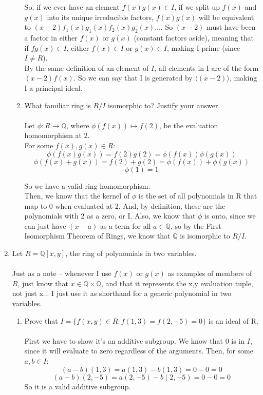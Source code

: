 \begin{enumerate}
\begin{enumerate}
          So, if we ever have an element $f(x)g(x) \in I$, if we split up $f(x)$ and $g(x)$ into its unique irreducible factors, $f(x)g(x)$ will be equivalent to $(x-2)f_1(x)g_1(x)f_2(x)g_2(x)\ldots$. So $(x-2)$ must have been a factor in either $f(x)$ or $g(x)$ (constant factors aside), meaning that if $fg(x) \in I$, either $f(x) \in I$ or $g(x) \in I$, making I prime (since $I \neq R$).\\

          By the same definition of an element of $I$, all elements in I are of the form $(x-2)f(x)$. So we can say that I is generated by $\langle (x-2) \rangle$, making I a principal ideal.\\
        
        \item What familiar ring is $R/I$ isomorphic to? Justify your answer.\\\\
          Let $\phi: R \rightarrow \mathds{Q}$, where $\phi(f(x)) \mapsto f(2)$, be the evaluation homomorphism at 2.\\
          For some $f(x), g(x) \in R$:
          $$\phi(f(x)g(x)) = f(2)g(2) = \phi(f(x))\phi(g(x))$$
          $$\phi(f(x) + g(x)) = f(2) + g(2) = \phi(f(x)) + \phi(g(x))$$
          $$\phi(1) = 1$$

          So we have a valid ring homomorphism.\\

          Then, we know that the kernel of $\phi$ is the set of all polynomials in R that map to 0 when evaluated at 2. And, by definition, these are the polynomials with 2 as a zero, or I. Also, we know that $\phi$ is onto, since we can just have $(x-a)$ as a term for all $a \in \mathds{Q}$, so by the First Isomorphism Theorem of Rings, we know that $\mathds{Q}$ is isomorphic to $R/I$.
        \end{enumerate}
        
    \item Let $R = \mathds{Q}[x,y]$, the ring of polynomials in two variables.\\\\

      Just as a note -- whenever I use $f(x)$ or $g(x)$ as examples of members of $R$, just know that $x \in \mathds{Q} \times \mathds{Q}$, and that it represents the x,y evaluation tuple, not just x... I just use it as shorthand for a generic polynomial in two variables.
        \begin{enumerate}
        \item Prove that $I = \{f(x,y) \in R : f(1,3) = f(2,-5) = 0 \}$ is an ideal of R.\\\\
          First we have to show it's an additive subgroup. We know that $0$ is in $I$, since it will evaluate to zero regardless of the arguments. Then, for some $a,b \in I$:
          $$(a-b)(1,3) = a(1,3) - b(1,3) = 0 - 0 = 0$$
          $$(a-b)(2,-5) = a(2,-5) - b(2,-5) = 0 - 0 = 0$$
          So it is a valid additive subgroup.\\
          

\end{enumerate}
\end{enumerate}
